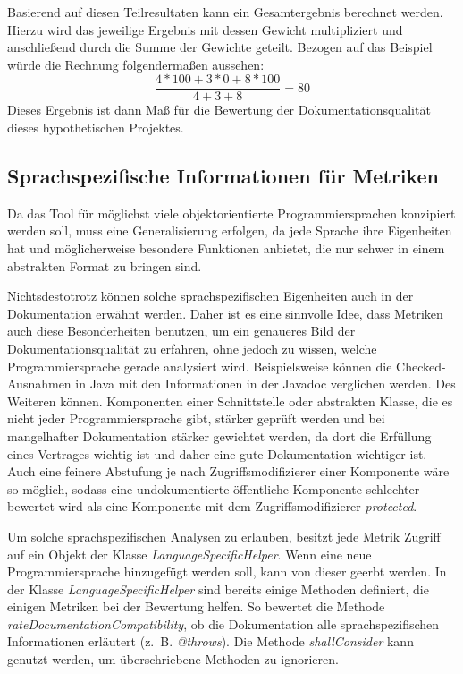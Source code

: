 Basierend auf diesen Teilresultaten kann ein Gesamtergebnis berechnet werden. Hierzu wird das jeweilige Ergebnis mit dessen Gewicht multipliziert und anschließend durch die Summe der Gewichte geteilt. Bezogen auf das Beispiel würde die Rechnung folgendermaßen aussehen:
\begin{equation}
    \frac{4*100 + 3*0 + 8*100}{4+3+8}=80
\end{equation}
Dieses Ergebnis ist dann Maß für die Bewertung der Dokumentationsqualität dieses hypothetischen Projektes. 


\subsection{Sprachspezifische Informationen für Metriken}\label{chapter:langSpec}
Da das Tool für möglichst viele objektorientierte Programmiersprachen konzipiert werden soll, muss eine Generalisierung erfolgen, da jede Sprache ihre Eigenheiten hat und möglicherweise besondere Funktionen anbietet, die nur schwer in einem abstrakten Format zu bringen sind.

Nichtsdestotrotz können solche sprachspezifischen Eigenheiten auch in der Dokumentation erwähnt werden. Daher ist es eine sinnvolle Idee, dass Metriken auch diese Besonderheiten benutzen, um ein genaueres Bild der Dokumentationsqualität zu erfahren, ohne jedoch zu wissen, welche Programmiersprache gerade analysiert wird. Beispielsweise können die Checked-Ausnahmen in Java mit den Informationen in der Javadoc verglichen werden. Des Weiteren können. Komponenten einer Schnittstelle oder abstrakten Klasse, die es nicht jeder Programmiersprache gibt, stärker geprüft werden und bei mangelhafter Dokumentation stärker gewichtet werden, da dort die Erfüllung eines Vertrages wichtig ist und daher eine gute Dokumentation wichtiger ist. Auch eine feinere Abstufung je nach Zugriffsmodifizierer einer Komponente wäre so möglich, sodass eine undokumentierte öffentliche Komponente schlechter bewertet wird als eine Komponente mit dem Zugriffsmodifizierer  \textit{protected}. 

Um solche sprachspezifischen Analysen zu erlauben, besitzt jede Metrik Zugriff auf ein Objekt der Klasse \textit{LanguageSpecificHelper}. Wenn eine neue Programmiersprache hinzugefügt werden soll, kann von dieser geerbt werden. In der Klasse \textit{LanguageSpecificHelper} sind bereits einige Methoden definiert, die einigen Metriken bei der Bewertung helfen. So bewertet die Methode \textit{rateDocumentationCompatibility}, ob die Dokumentation alle sprachspezifischen Informationen erläutert (z.~B. \textit{@throws}). Die Methode \textit{shallConsider} kann genutzt werden, um überschriebene Methoden zu ignorieren. 

